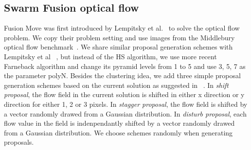 \subsection{Swarm Fusion optical flow}

Fusion Move was first introduced by Lempitsky et al.~\cite{fusion_flow} to
solve the optical flow problem.
We copy their problem setting and use images from the Middlebury optical flow
benchmark~\cite{middlebury_optical_flow}. We share similar proposal generation schemes with Lempitsky et al ~\cite{fusion_flow}, but instead of the HS algorithm, we use more recent Farneback algorithm and change its pyramid levels from 1 to 5 and use {3, 5, 7} as the parameter polyN. Besides the clustering idea, we add three simple proposal generation schemes based on the current solution as suggested in ~\cite{fusion_flow}. In \textit{shift proposal}, the flow field in the current solution is shifted in either x direction or y direction for either 1, 2 or 3 pixels. In \textit{stagger proposal}, the flow field is shifted by a vector randomly drawed from a Gaussian distribution. In \textit{disturb proposal}, each flow value in the field is indenpendantly shifted by a vector randomly drawed from a Gaussian distribution. We choose schemes randomly when generating proposals.



